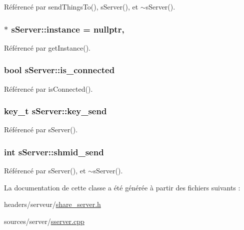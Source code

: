 Référencé par send\-Things\-To(), s\-Server(), et $\sim$s\-Server().

\hypertarget{classsServer_a5567b4d6b98047dbc17c7c4072a71a62}{
\subsubsection[{instance}]{ $\ast$ s\-Server\-::instance = nullptr\hspace{0.3cm}{\ttfamily [static]}, {\ttfamily [private]}}}\label{classsServer_a5567b4d6b98047dbc17c7c4072a71a62}


Référencé par get\-Instance().

\hypertarget{classsServer_adeee5a2ac165a0d9df35757d2ddfc70d}{
\subsubsection[{is\-\_\-connected}]{\setlength{\rightskip}{0pt plus 5cm}bool s\-Server\-::is\-\_\-connected\hspace{0.3cm}{\ttfamily [private]}}}\label{classsServer_adeee5a2ac165a0d9df35757d2ddfc70d}


Référencé par is\-Connected().

\hypertarget{classsServer_a9300a483fb708e2e0208d5e1e53e0c97}{
\subsubsection[{key\-\_\-send}]{\setlength{\rightskip}{0pt plus 5cm}key\-\_\-t s\-Server\-::key\-\_\-send\hspace{0.3cm}{\ttfamily [private]}}}\label{classsServer_a9300a483fb708e2e0208d5e1e53e0c97}


Référencé par s\-Server().

\hypertarget{classsServer_ab7c99a899b82ac73c36c30da01ab7944}{
\subsubsection[{shmid\-\_\-send}]{\setlength{\rightskip}{0pt plus 5cm}int s\-Server\-::shmid\-\_\-send\hspace{0.3cm}{\ttfamily [private]}}}\label{classsServer_ab7c99a899b82ac73c36c30da01ab7944}


Référencé par s\-Server(), et $\sim$s\-Server().



La documentation de cette classe a été générée à partir des fichiers suivants \-:\begin{DoxyCompactItemize}
\item 
headers/serveur/\hyperlink{share__server_8h}{share\-\_\-server.\-h}\item 
sources/server/\hyperlink{sserver_8cpp}{sserver.\-cpp}\end{DoxyCompactItemize}
